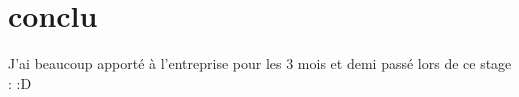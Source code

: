 \section{conclu}

J'ai beaucoup apporté à l'entreprise pour les 3 mois et demi passé lors de ce stage :
:D